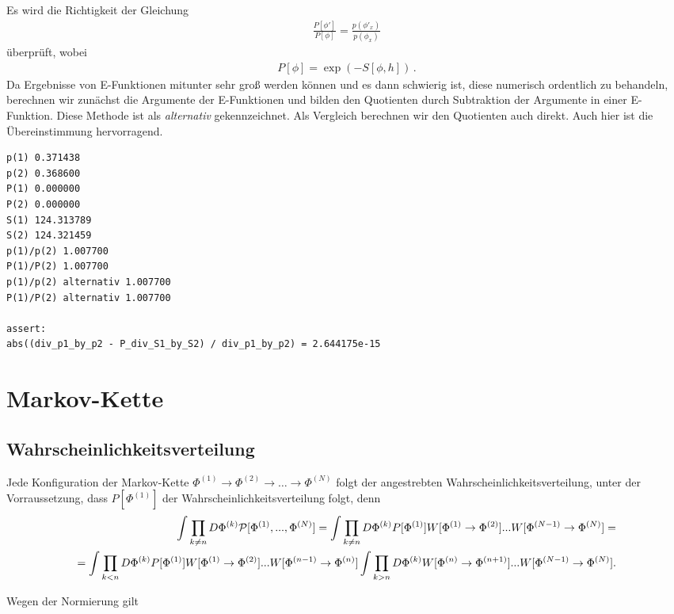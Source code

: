 \documentclass[10pt,a4paper]{article}
\begin{document}
Es wird die Richtigkeit der Gleichung
\begin{align*}
  \frac{P\left[ \phi' \right]}{P\left[ \phi \right]} = \frac{p\left( \phi'_{x} \right)}{p\left( \phi_{x} \right)}
\end{align*}
überprüft, wobei
\begin{align*}
  P\left[ \phi \right] = \exp\left( - S\left[ \phi, h \right] \right)\,.
\end{align*}
Da Ergebnisse von E-Funktionen mitunter sehr groß werden können und es dann
schwierig ist, diese numerisch ordentlich zu behandeln, berechnen wir zunächst
die Argumente der E-Funktionen und bilden den Quotienten durch Subtraktion der
Argumente in einer E-Funktion. Diese Methode ist als \emph{alternativ}
gekennzeichnet. Als Vergleich berechnen wir den Quotienten auch direkt. Auch
hier ist die Übereinstimmung hervorragend.
\begin{verbatim}
p(1) 0.371438
p(2) 0.368600
P(1) 0.000000
P(2) 0.000000
S(1) 124.313789
S(2) 124.321459
p(1)/p(2) 1.007700
P(1)/P(2) 1.007700
p(1)/p(2) alternativ 1.007700
P(1)/P(2) alternativ 1.007700

assert:
abs((div_p1_by_p2 - P_div_S1_by_S2) / div_p1_by_p2) = 2.644175e-15
\end{verbatim}


\section{Markov-Kette}

\subsection{Wahrscheinlichkeitsverteilung}
Jede Konfiguration der Markov-Kette $\Phi^{(1)}\to \Phi^{(2)}\to\dots\to \Phi^{(N)}$
folgt der angestrebten Wahrscheinlichkeitsverteilung, unter der Vorraussetzung,
dass $P[\Phi^{(1)}]$ der Wahrscheinlichkeitsverteilung folgt, denn
 \begin{align*}
	\int \prod_{k\neq n} D\Phi^{(k)} {\cal P}[\Phi^{(1)},...,\Phi^{(N)}] = \int \prod_{k\neq n} D\Phi^{(k)}P[\Phi^{(1)}] W[\Phi^{(1)}\to \Phi^{(2)}]...W[\Phi^{(N-1)}\to \Phi^{(N)}]= \\
	=\int \prod_{k <  n} D\Phi^{(k)}P[\Phi^{(1)}] W[\Phi^{(1)}\to \Phi^{(2)}]...W[\Phi^{(n-1)}\to \Phi^{(n)}] \int \prod_{k > n} D\Phi^{(k)} W[\Phi^{(n)}\to \Phi^{(n+1)}]...W[\Phi^{(N-1)}\to \Phi^{(N)}].
 \end{align*}

Wegen der Normierung gilt
\end{document}
